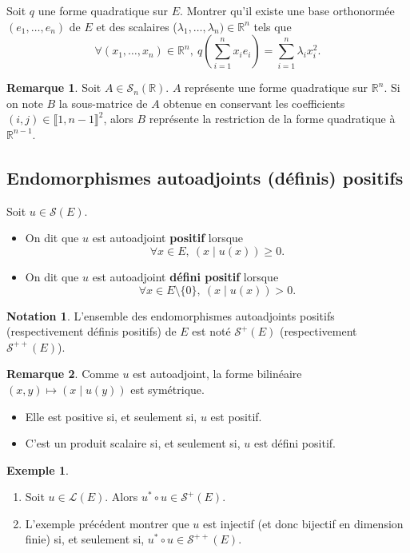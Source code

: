 \documentclass[french]{article}
\newcommand{\R}{\mathbb{R}}
\newcommand{\st}{^*}
\theoremstyle{plain}
\theoremstyle{definition}
\newtheorem*{ex}{Exemple}
\newtheorem*{rmq}{Remarque}
\newtheorem*{notation}{Notation}
\theoremstyle{remark}
\begin{document}
\begin{exo}
	Soit $q$ une forme quadratique sur $E$. Montrer qu'il existe une base orthonormée $(e_1,\ldots,e_n)$ de $E$ et des scalaires ($\lambda_1,\ldots,\lambda_n)\in\R^n$ tels que $$\forall (x_1,\ldots,x_n)\in\R^n,\ q\left(\sum_{i=1}^{n}x_ie_i\right)=\sum_{i=1}^{n}\lambda_ix_i^2.$$
\end{exo}

\begin{rmq}
	Soit $A\in\mathcal{S}_n(\R)$. $A$ représente une forme quadratique sur $\R^n$. Si on note $B$ la sous-matrice de $A$ obtenue en conservant les coefficients $(i,j)\in\llbracket1,n-1\rrbracket^2$, alors $B$ représente la restriction de la forme quadratique à $\R^{n-1}$.
\end{rmq}

\subsection{Endomorphismes autoadjoints (définis) positifs}

\begin{dfn}
	Soit $u\in\mathcal{S}(E)$.
	\begin{itemize}
		\item On dit que $u$ est autoadjoint \textbf{positif} lorsque $$\forall x\in E,\ (x\mid u(x))\geqslant 0.$$
		\item On dit que $u$ est autoadjoint \textbf{défini positif} lorsque $$\forall x\in E\setminus\{0\},\ (x\mid u(x))> 0.$$
	\end{itemize}
\end{dfn}

\begin{notation}
	L'ensemble des endomorphismes autoadjoints positifs (respectivement définis positifs) de $E$ est noté $\mathcal{S}^+(E)$ (respectivement $\mathcal{S}^{++}(E)$).
\end{notation}

\begin{rmq}
	Comme $u$ est autoadjoint, la forme bilinéaire $(x,y)\mapsto (x\mid u(y))$ est symétrique.
	\begin{itemize}
		\item Elle est positive si, et seulement si, $u$ est positif.
		\item C'est un produit scalaire si, et seulement si, $u$ est défini positif.
	\end{itemize}
\end{rmq}

\begin{ex}
	\begin{enumerate}
		\item Soit $u\in\mathcal{L}(E)$. Alors $u\st\circ u\in\mathcal{S}^+(E)$.
		\item L'exemple précédent montrer que $u$ est injectif (et donc bijectif en dimension finie) si, et seulement si, $u\st\circ u\in\mathcal{S}^{++}(E)$.
	\end{enumerate}
\end{ex}
\end{document}

